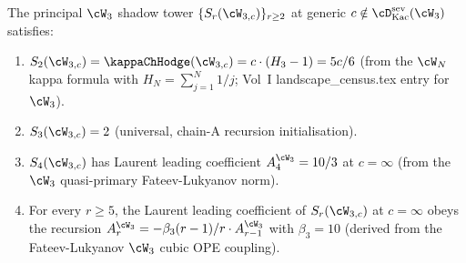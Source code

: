 \begin{proposition}
\label{prop:w3-shadow-leading-asymptotic}
The principal $\cW_3$ shadow tower $\{S_r(\cW_{3, c})\}_{r \ge 2}$ at
generic $c \notin \cD^{\mathrm{sev}}_{\mathrm{Kac}}(\cW_3)$ satisfies:
\begin{enumerate}[nosep]
\item $S_2(\cW_{3, c}) = \kappaChHodge(\cW_{3, c}) = c \cdot (H_3 - 1) = 5c/6$
 (from the $\cW_N$ kappa formula with $H_N = \sum_{j=1}^{N} 1/j$;
 Vol~I landscape\_census.tex entry for $\cW_3$).
\item $S_3(\cW_{3, c}) = 2$ (universal, chain-A recursion initialisation).
\item $S_4(\cW_{3, c})$ has Laurent leading coefficient
 $A_4^{\cW_3} = 10/3$ at $c = \infty$ (from the $\cW_3$ quasi-primary
 Fateev-Lukyanov norm).
\item For every $r \ge 5$, the Laurent leading coefficient of
 $S_r(\cW_{3, c})$ at $c = \infty$ obeys the recursion
 $A_r^{\cW_3} = -\beta_3 (r-1) / r \cdot A_{r-1}^{\cW_3}$ with
 $\beta_3 = 10$ (derived from the Fateev-Lukyanov $\cW_3$ cubic OPE
 coupling).
\end{enumerate}
\end{proposition}

